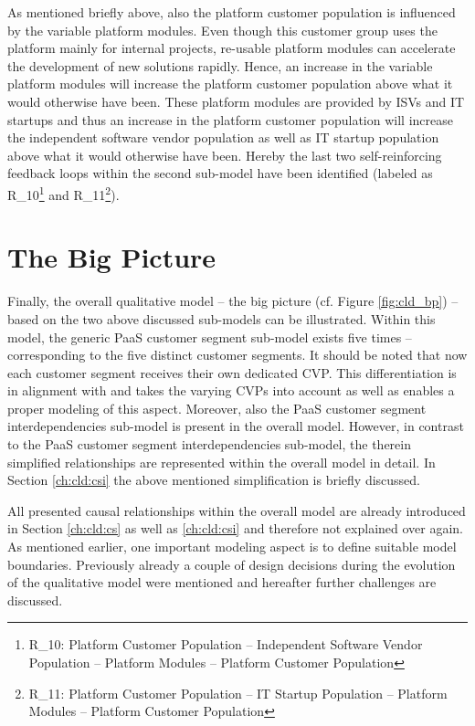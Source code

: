 As mentioned briefly above, also the platform customer population is influenced by the variable platform modules. Even though this customer group uses the platform mainly for internal projects, re-usable platform modules can accelerate the development of new solutions rapidly. Hence, an increase in the variable platform modules will increase the platform customer population above what it would otherwise have been. These platform modules are provided by \acp{ISV} and \ac{IT} startups and thus an increase in the platform customer population will increase the independent software vendor population as well as \ac{IT} startup population above what it would otherwise have been. Hereby the last two self-reinforcing feedback loops within the second sub-model have been identified (labeled as R\_10\footnote{R\_10: Platform Customer Population -- Independent Software Vendor Population -- Platform Modules -- Platform Customer Population} and R\_11\footnote{R\_11: Platform Customer Population -- \ac{IT} Startup Population -- Platform Modules -- Platform Customer Population}).

\section{The Big Picture}\label{ch:cld:bp}

Finally, the overall qualitative model -- the big picture (cf. Figure \ref{fig:cld_bp}) -- based on the two above discussed sub-models can be illustrated. Within this model, the generic \ac{PaaS} customer segment sub-model exists five times -- corresponding to the five distinct customer segments. It should be noted that now each customer segment receives their own dedicated \ac{CVP}. This differentiation is in alignment with \citet{Johnson2008} and takes the varying \acp{CVP} into account as well as enables a proper modeling of this aspect. Moreover, also the \ac{PaaS} customer segment interdependencies sub-model is present in the overall model. However, in contrast to the \ac{PaaS} customer segment interdependencies sub-model, the therein simplified relationships are represented within the overall model in detail. In Section \ref{ch:cld:csi} the above mentioned simplification is briefly discussed.

All presented causal relationships within the overall model are already introduced in Section \ref{ch:cld:cs} as well as \ref{ch:cld:csi} and therefore not explained over again. As mentioned earlier, one important modeling aspect is to define suitable model boundaries. Previously already a couple of design decisions during the evolution of the qualitative model were mentioned and hereafter further challenges are discussed.

